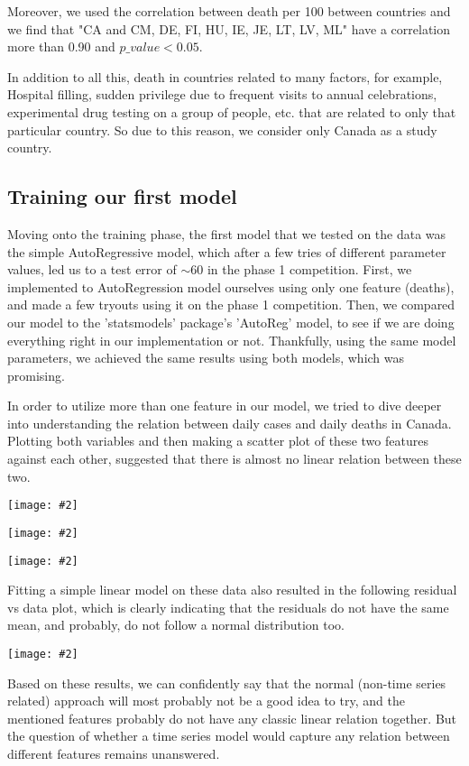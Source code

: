 \documentclass{article}
\newcommand{\centerfig}[2]{\begin{center}\texttt{[image: \#2]}\end{center}}
\begin{document}
Moreover, we used the correlation between death per 100 between countries and we find that "CA and CM, DE, FI, HU, IE, JE, LT, LV, ML" have a correlation more than 0.90 and $p\_value <0.05$.

In addition to all this, death in countries related to many factors, for example, Hospital filling, sudden privilege due to frequent visits to annual celebrations, experimental drug testing on a group of people, etc. that are related to only that particular country. So due to this reason, we consider only Canada as a study country.


\subsection{Training our first model}

Moving onto the training phase, the first model that we tested on the data was the simple AutoRegressive model, which after a few tries of different parameter values, led us to a test error of $\sim60$ in the phase 1 competition. First, we implemented to AutoRegression model ourselves using only one feature (deaths), and made a few tryouts using it on the phase 1 competition. Then, we compared our model to the 'statsmodels' package’s 'AutoReg' model, to see if we are doing everything right in our implementation or not. Thankfully, using the same model parameters, we achieved the same results using both models, which was promising.


In order to utilize more than one feature in our model, we tried to dive deeper into understanding the relation between daily cases and daily deaths in Canada. Plotting both variables and then making a scatter plot of these two features against each other, suggested that there is almost no linear relation between these two.

\centerfig{.5}{./Images/5}

\centerfig{.5}{./Images/6}

\centerfig{.5}{./Images/7}

Fitting a simple linear model on these data also resulted in the following residual vs data plot, which is clearly indicating that the residuals do not have the same mean, and probably, do not follow a normal distribution too.

\centerfig{.6}{./Images/8}

Based on these results, we can confidently say that the normal (non-time series related) approach will most probably not be a good idea to try, and the mentioned features probably do not have any classic linear relation together. But the question of whether a time series model would capture any relation between different features remains unanswered.
\end{document}

